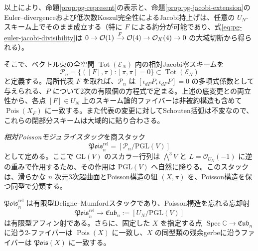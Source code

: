 以上により、命題\ref{prop:pg-represent}の表示と、命題\ref{prop:pg-jacobi-extension}のEuler--divergenceおよび低次数Koszul完全性によるJacobi持上げは、任意の $U_N$-スキーム上でそのまま成立する（特に $F$ による約分が可能であり、式\eqref{eq:pg-euler-jacobi-divisibility}は $0\to\mathcal O(1)\xrightarrow{F}\mathcal O(4)\to\mathcal O_X(4)\to0$ の大域切断から得られる）。

そこで、ベクトル束の全空間 $\operatorname{Tot}(\mathscr E_N)$ 内の相対Jacobi零スキームを
\begin{equation}\label{eq:pg-relative-pois-space}
  \mathscr P_n=
  \{([F],\pi):[\pi,\pi]=0\}
  \subset\operatorname{Tot}(\mathscr E_N)
\end{equation}
と定義する。局所代表 $F$ を取れば、$\mathscr P_n$ は $[\iota_{dF}P,\iota_{dF}P]=0$ の多項式係数として与えられる、$P$ について2次の有限個の方程式で定まる。上述の底変更との両立性から、各点 $[F]\in U_N$ 上のスキーム論的ファイバーは非被約構造も含めて $\operatorname{Pois}(X_F)$ に一致する。また代表の変更に対してSchouten括弧は不変なので、これらの閉部分スキームは大域的に貼り合わさる。

\begin{definition}\label{def:pg-relative-pois-stack}
\emph{相対Poissonモジュライスタック}を商スタック
\begin{equation}\label{eq:pg-relative-pois-stack}
\mathfrak{Pois}^{\mathrm{rel}}_n
=[\mathscr P_n/\mathrm{PGL}(V)]
\end{equation}
として定める。ここで $\mathrm{GL}(V)$ のスカラー行列は $\bigwedge^3V$ と $L=\mathcal O_{U_N}(-1)$ に逆の重みで作用するため、その作用は $\mathrm{PGL}(V)$ へ自然に降りる。このスタックは、滑らかな $n$ 次元3次超曲面とPoisson構造の組 $(X,\pi)$ を、Poisson構造を保つ同型で分類する。
\end{definition}

\begin{theorem}\label{thm:pg-relative-stack-algebraic}
$\mathfrak{Pois}^{\mathrm{rel}}_n$ は有限型Deligne--Mumfordスタックであり、Poisson構造を忘れる忘却射
\begin{equation}\label{eq:pg-relative-forget}
\mathfrak{Pois}^{\mathrm{rel}}_n\longrightarrow
\mathfrak{Cub}_n:=[U_N/\mathrm{PGL}(V)]
\end{equation}
は有限型アフィン射である。さらに、固定した $X$ を指定する点 $\operatorname{Spec}\mathbb C\to\mathfrak{Cub}_n$ に沿う2-ファイバーは $\operatorname{Pois}(X)$ に一致し、$X$ の同型類の残余gerbeに沿うファイバーは $\mathfrak{Pois}(X)$ に一致する。
\end{theorem}

